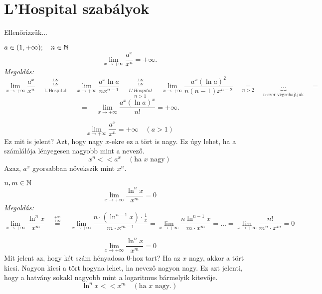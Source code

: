 \documentclass[a4paper,11.5pt]{article}
\begin{document}
	\section{L'Hospital szabályok}
	Ellenőrizzük...
	\begin{task} $a\in(1,+\infty);\quad n\in\mathbb{N}$
		\[ \lim_{x\to+\infty}\frac{a^x}{x^n}=+\infty. \]
		\textit{Megoldás:}
		\[ \lim_{x\to+\infty}\frac{a^x}{x^n}\quad \overset{\frac{+\infty}{+\infty}}{\underset{\text{L'Hospital}}{=}}\quad  \lim_{x\to+\infty}\frac{a^x\ln a}{nx^{n-1}}\quad \overset{\frac{+\infty}{+\infty}}{\underset{n>1}{\underset{L'Hospital}{=}}}\quad \lim_{x\to+\infty}\frac{a^x(\ln a)^2}{n(n-1)x^{n-2}}\quad \underset{n>2}{=}\quad \underbrace{\ldots}_{\text{n-szer végrehajtjuk}}\quad =\]
		\[=\quad \lim_{x\to+\infty}\frac{a^x(\ln a)^x}{n!}=+\infty.  \]
	\end{task}
	\begin{note}
		\[ \lim_{x\to+\infty}\frac{a^x}{x^n}=+\infty\quad (a>1) \]
		Ez mit is jelent? Azt, hogy nagy $x$-ekre ez a tört is nagy. Ez úgy lehet, ha a számlálója lényegesen nagyobb mint a nevező.
		\[ x^n << a^x \quad (\text{ha $x$ nagy}) \]
		Azaz, $a^x$ gyorsabban növekszik mint $x^n$.
	\end{note}
	\begin{task}
		$n,m\in \mathbb{N}$
		\[ \lim_{x\to+\infty}\frac{\ln^n x}{x^m}=0 \]
		\textit{Megoldás:}
		\[ \lim_{x\to+\infty}\frac{\ln^nx}{x^m}\quad \overset{\frac{+\infty}{+\infty}}{=}\quad \lim_{x\to+\infty}\frac{n\cdot (\ln^{n-1}x)\cdot \frac{1}{x} }{m\cdot x^{m-1}}=\lim_{x\to+\infty}\frac{n\ln^{n-1}x}{m\cdot x^m} =\ldots=\lim_{x\to+\infty}\frac{n!}{m^n\cdot x^m}=0 \]
	\end{task}
	\begin{note}
		\[ \lim_{x\to+\infty}\frac{\ln^n x}{x^m}=0 \]
		Mit jelent az, hogy két szám hényadosa 0-hoz tart? Ha az $x$ nagy, akkor a tört kicsi. Nagyon kicsi a tört hogyna lehet, ha nevező nagyon nagy. Ez azt jelenti, hogy a hatvány sokakl nagyobb mint a logaritmus bármelyik kitevője.
		\[ \ln^nx<<x^m\quad (\text{ha $x$ nagy.}) \]
	\end{note}
\end{document}
